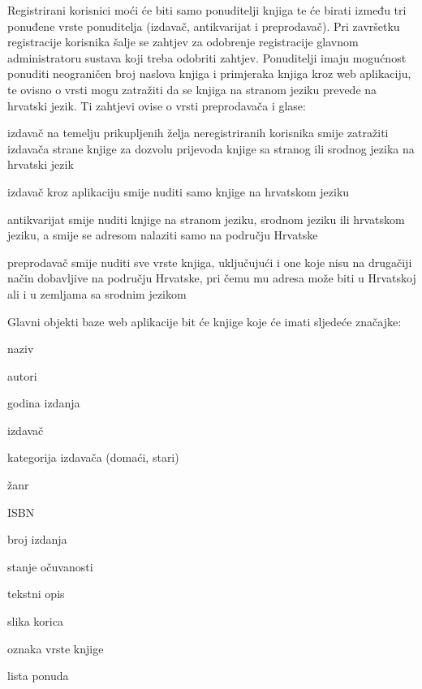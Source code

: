 	Registrirani korisnici moći će biti samo ponuditelji knjiga te će birati između tri ponuđene vrste ponuditelja (izdavač, antikvarijat i preprodavač). Pri završetku registracije korisnika šalje se zahtjev za odobrenje registracije glavnom administratoru sustava koji treba odobriti zahtjev. Ponuditelji imaju mogućnost ponuditi neograničen broj naslova knjiga i primjeraka knjiga kroz web aplikaciju, te ovisno o vrsti mogu zatražiti da se knjiga na stranom jeziku prevede na hrvatski jezik. Ti zahtjevi ovise o vrsti preprodavača i glase:
	
	\begin{packed_item}
		\item izdavač na temelju prikupljenih želja neregistriranih korisnika smije zatražiti izdavača strane knjige za dozvolu prijevoda knjige sa stranog ili srodnog jezika na hrvatski jezik
		\item izdavač kroz aplikaciju smije nuditi samo knjige na hrvatskom jeziku
		\item antikvarijat smije nuditi knjige na stranom jeziku, srodnom jeziku ili hrvatskom jeziku, a smije se adresom nalaziti samo na području Hrvatske
		\item preprodavač smije nuditi sve vrste knjiga, uključujući i one koje nisu na drugačiji način dobavljive na području Hrvatske, pri čemu mu adresa može biti u Hrvatskoj ali i u zemljama sa srodnim jezikom
	\end{packed_item} 
	
	Glavni objekti baze web aplikacije bit će knjige koje će imati sljedeće značajke: 
	
	\begin{packed_item}
		\item naziv
		\item autori
		\item godina izdanja
		\item izdavač
		\item kategorija izdavača (domaći, stari)
		\item žanr
		\item ISBN
		\item broj izdanja
		\item stanje očuvanosti
		\item tekstni opis
		\item slika korica
		\item oznaka vrste knjige
		\item lista ponuda
	\end{packed_item}
	
